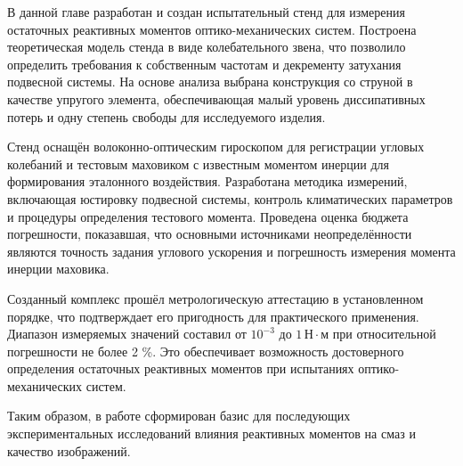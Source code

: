В данной главе разработан и создан испытательный стенд для измерения остаточных реактивных моментов оптико-механических систем.  
Построена теоретическая модель стенда в виде колебательного звена, что позволило определить требования к собственным частотам и декременту затухания подвесной системы. На основе анализа выбрана конструкция со струной в качестве упругого элемента, обеспечивающая малый уровень диссипативных потерь и одну степень свободы для исследуемого изделия.

Стенд оснащён волоконно-оптическим гироскопом для регистрации угловых колебаний и тестовым маховиком с известным моментом инерции для формирования эталонного воздействия. Разработана методика измерений, включающая юстировку подвесной системы, контроль климатических параметров и процедуры определения тестового момента. Проведена оценка бюджета погрешности, показавшая, что основными источниками неопределённости являются точность задания углового ускорения и погрешность измерения момента инерции маховика.

Созданный комплекс прошёл метрологическую аттестацию в установленном порядке, что подтверждает его пригодность для практического применения. Диапазон измеряемых значений составил от $10^{-3}$ до $1 \,\text{Н}\cdot\text{м}$ при относительной погрешности не более 2 \%. Это обеспечивает возможность достоверного определения остаточных реактивных моментов при испытаниях оптико-механических систем.

Таким образом, в работе сформирован базис для последующих экспериментальных исследований влияния реактивных моментов на смаз и качество изображений. 



\clearpage
\FloatBarrier
